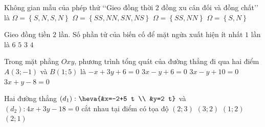 \begin{ex}%
Không gian mẫu của phép thử \lq\lq Gieo đồng thời $2$ đồng xu cân đối và đồng chất\rq\rq\, là
\choice
{$\Omega=\left\{S, N, S, N\right\}$}
{\True $\Omega=\left\{SS, NN, SN, NS\right\}$}
{$\Omega=\left\{SS, NN\right\}$}
{$\Omega=\left\{S, N\right\}$}
\end{ex}

\begin{ex}%
Gieo đồng tiền $2$ lần. Số phần tử của biến cố để mặt ngửa xuất hiện ít nhất $1$ lần là
\choice
{$6$}
{$5$}
{\True $3$}
{$4$}
\end{ex}

\begin{ex}%
Trong mặt phẳng $Oxy$, phương trình tổng quát của đường thẳng đi qua hai điểm $A\left(3;-1\right)$ và $B\left(1;5\right)$ là
\choice
{$-x+3y+6=0$}
{$3x-y+6=0$}
{$3x-y+10=0$}
{\True $3x+y-8=0$}
\end{ex}

\begin{ex}%
Hai đường thẳng $\left(d_1\right) \colon \heva{&x=-2+5 t \\ &y=2 t}$ và $\left(d_2\right) \colon 4 x+3 y-18=0$ cắt nhau tại điểm có tọa độ
\choice
{\True $(2 ; 3)$}
{$(3 ; 2)$}
{$(1 ; 2)$}
{$(2 ; 1)$}
\end{ex}

